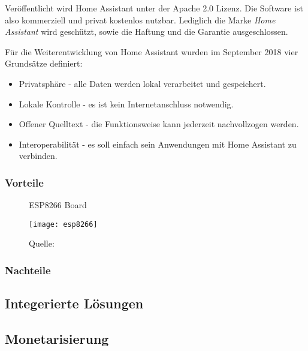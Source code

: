 Veröffentlicht wird Home Assistant unter der Apache 2.0 Lizenz.
Die Software ist also kommerziell und privat kostenlos nutzbar.
Lediglich die Marke \textit{Home Assistant} wird geschützt, sowie die Haftung und die Garantie ausgeschlossen.

Für die Weiterentwicklung von Home Assistant wurden im September 2018 vier Grundsätze definiert:

\begin{itemize}
	\item Privatsphäre - alle Daten werden lokal verarbeitet und gespeichert.
	\item Lokale Kontrolle - es ist kein Internetanschluss notwendig.
	\item Offener Quelltext - die Funktionsweise kann jederzeit nachvollzogen werden.
	\item Interoperabilität - es soll einfach sein Anwendungen mit Home Assistant zu verbinden.
\end{itemize}


\subsubsection{Vorteile}


\begin{wrapfigure}{r}{0.4\textwidth}
	\centering
	\caption{ESP8266 Board}
	\texttt{[image: esp8266]}
	\caption*{\footnotesize{Quelle: }}
	\label{fig:esp8266}
\end{wrapfigure}

\subsubsection{Nachteile}


\subsection{Integerierte Lösungen} %



\subsection{Monetarisierung}

